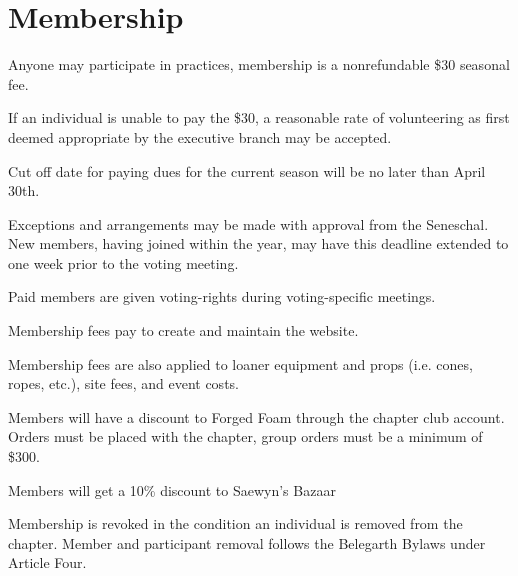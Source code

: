 \documentclass[12pt]{article}
\begin{document}
\section{Membership}
\begin{level}
    \item Anyone may participate in practices, membership is a nonrefundable \$30 seasonal fee.
    \begin{level}
        \item If an individual is unable to pay the \$30, a reasonable rate of volunteering as first deemed appropriate by the executive branch may be accepted.
        \item Cut off date for paying dues for the current season will be no later than April 30th.
        \item Exceptions and arrangements may be made with approval from the Seneschal. New members, having joined within the year, may have this deadline extended to one week prior to the voting meeting.
    \end{level}
    \item Paid members are given voting-rights during voting-specific meetings.
    \item Membership fees pay to create and maintain the website.
    \item Membership fees are also applied to loaner equipment and props (i.e. cones, ropes, etc.), site fees, and event costs.
    \item Members will have a discount to Forged Foam through the chapter club account. Orders must be placed with the chapter, group orders must be a minimum of \$300.
    \item Members will get a 10\% discount to Saewyn's Bazaar
    \item Membership is revoked in the condition an individual is removed from the chapter. Member and participant removal follows the Belegarth Bylaws under Article Four.
\end{level}
\end{document}
